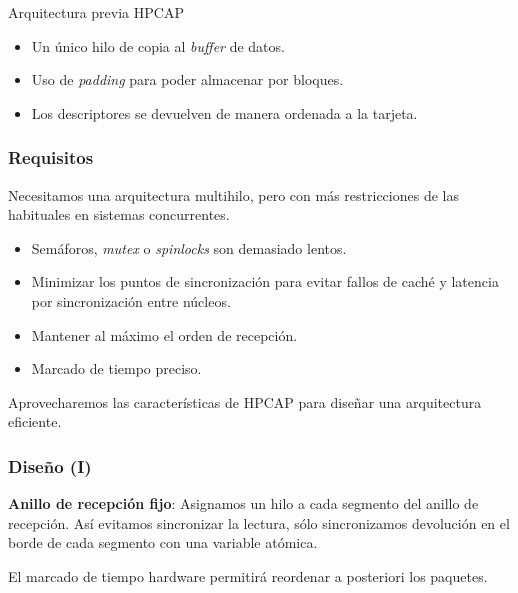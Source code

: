 \documentclass[10pt,notes,compress,usetitleprogressbar,aspectratio=1610]{beamer}
\begin{document}
\begin{frame}{Arquitectura previa HPCAP}

\begin{figure}[hbtp]
\centering

\end{figure}

\begin{itemize}
\item Un único hilo de copia al \textit{buffer} de datos.
\item Uso de \textit{padding} para poder almacenar por bloques. 
\item Los descriptores se devuelven de manera ordenada a la tarjeta.
\end{itemize}

\end{frame}

\begin{frame}
\frametitle{Requisitos}


Necesitamos una arquitectura multihilo, pero con más restricciones de las habituales en sistemas concurrentes.

\begin{itemize}
\item Semáforos, \textit{mutex} o \textit{spinlocks} son demasiado lentos.
\item Minimizar los puntos de sincronización para evitar fallos de caché y latencia por sincronización entre núcleos.
\item Mantener al máximo el orden de recepción.
\item Marcado de tiempo preciso.
\end{itemize}

Aprovecharemos las características de HPCAP para diseñar una arquitectura eficiente.
\end{frame}

\begin{frame}
\frametitle{Diseño (I)}

\begin{figure}
\centering

\end{figure}

\textbf{Anillo de recepción fijo}: Asignamos un hilo a cada segmento del anillo de recepción. Así evitamos sincronizar la lectura, sólo sincronizamos devolución en el borde de cada segmento con una variable atómica. 

El marcado de tiempo hardware permitirá reordenar a posteriori los paquetes.

\end{frame}
\end{document}
